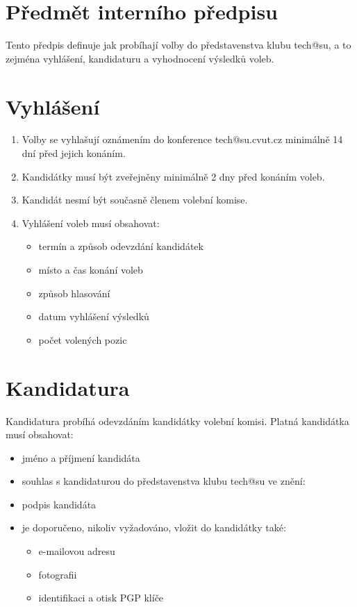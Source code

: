 \documentclass[10pt]{article}
\begin{document}
\section{Předmět interního předpisu}
	Tento předpis definuje jak probíhají volby do představenstva klubu tech@su, a to zejména vyhlášení, kandidaturu a vyhodnocení výsledků voleb.

\section{Vyhlášení}
	\begin{enumerate}
		\item Volby se vyhlašují oznámením do konference tech@su.cvut.cz minimálně 14 dní před jejich konáním.
		\item Kandidátky musí být zveřejněny minimálně 2 dny před konáním voleb.
		\item Kandidát nesmí být současně členem volební komise.
		\item Vyhlášení voleb musí obsahovat:
			\begin{itemize}
				\item termín a způsob odevzdání kandidátek
				\item místo a čas konání voleb
				\item způsob hlasování
				\item datum vyhlášení výsledků
				\item počet volených pozic
			\end{itemize}
	\end{enumerate}
	
\section{Kandidatura}
	Kandidatura probíhá odevzdáním kandidátky volební komisi. Platná kandidátka musí obsahovat:
	\begin{itemize}
		\item jméno a příjmení kandidáta
		\item souhlas s kandidaturou do představenstva klubu tech@su ve znění: 
		\item podpis kandidáta
		\item je doporučeno, nikoliv vyžadováno, vložit do kandidátky také: 
			\begin{itemize}
				\item e-mailovou adresu
				\item fotografii
				\item identifikaci a otisk PGP klíče
			\end{itemize}
	\end{itemize}
\end{document}
